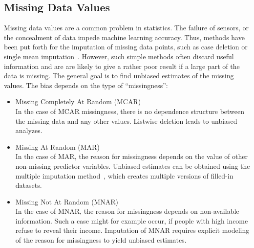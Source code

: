 \documentclass[a4paper]{article}
\begin{document}
\subsection{Missing Data Values}

Missing data values are a common problem in statistics. The failure of
sensors, or the concealment of data impede machine learning
accuracy. Thus, methods have been put forth for the imputation of
missing data points, such as case deletion or single mean
imputation~\cite{schafer2002missing}. However, such simple methods
often discard useful information and are are likely to give a rather
poor result if a large part of the data is missing. The general goal
is to find unbiased estimates of the missing values. The bias depends
on the type of ``missingness'':

\begin{itemize}
\item Missing Completely At Random (MCAR)\\
  In the case of MCAR missingness, there is no dependence structure
  between the missing data and any other values. Listwise deletion
  leads to unbiased analyzes.
\item Missing At Random (MAR)\\
  In the case of MAR, the reason for missingness depends on the value
  of other non-missing predictor variables. Unbiased estimates can be
  obtained using the multiple imputation method~\cite{de2013multiple},
  which creates multiple versions of filled-in datasets.
\item Missing Not At Random (MNAR)\\
  In the case of MNAR, the reason for missingness depends on
  non-available information. Such a case might for example occur, if
  people with high income refuse to reveal their income. Imputation of
  MNAR requires explicit modeling of the reason for missingness to
  yield unbiased estimates.
\end{itemize}
\end{document}
